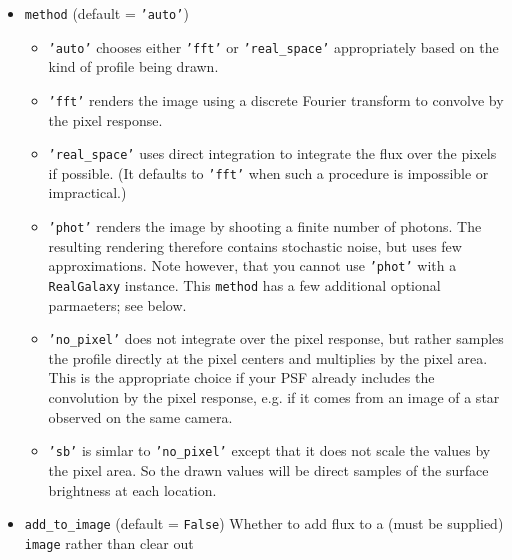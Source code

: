 \documentclass[preprint,11pt]{../../devel/modules/aastex}
\begin{document}
\begin{itemize}
{\begin{itemize}
    coordinates and world (aka sky) coordinates.  The \texttt{GSObject}
    is taken to be defined in world coordinates and this function tells
    GalSim how to convert to image coordinates when it draws the profile.
    If neither \texttt{scale} nor \texttt{wcs} are provided here, then GalSim will
    use the \texttt{wcs} attribute of the \texttt{image} if available.
    Otherwise, it will use the Nyquist scale given the
    maximum modeled frequency in the \texttt{GSObject}.
  \item \texttt{method} (default = \texttt{'auto'})
    \begin{itemize}
      \item \texttt{'auto'} chooses either \texttt{'fft'} or \texttt{'real\_space'}
        appropriately based on the kind of profile being drawn.
      \item \texttt{'fft'} renders the image using a discrete Fourier transform to convolve by the
        pixel response.
      \item \texttt{'real\_space'} uses direct integration to integrate the flux over the pixels
        if possible.  (It defaults to \texttt{'fft'} when such a procedure is impossible or 
        impractical.)
      \item \texttt{'phot'} renders the image by shooting a finite number of photons.
        The resulting rendering therefore contains stochastic noise, but uses few approximations.
        Note however, that you cannot use \texttt{'phot'} with a \texttt{RealGalaxy} instance.
        This \texttt{method} has a few additional optional parmaeters; see below.
      \item \texttt{'no\_pixel'} does not integrate over the pixel response, but rather samples
        the profile directly at the pixel centers and multiplies by the pixel area.  This is
        the appropriate choice if your PSF already includes the convolution by the pixel response,
        e.g. if it comes from an image of a star observed on the same camera.
      \item \texttt{'sb'} is simlar to \texttt{'no\_pixel'} except that it does not scale the
        values by the pixel area.  So the drawn values will be direct samples of the surface
        brightness at each location.
    \end{itemize}
  \item \texttt{add\_to\_image} (default = \texttt{False}) \newline
    Whether to add flux to a (must be supplied) \texttt{image} rather than clear out

\end{itemize}}
\end{itemize}
\end{document}
